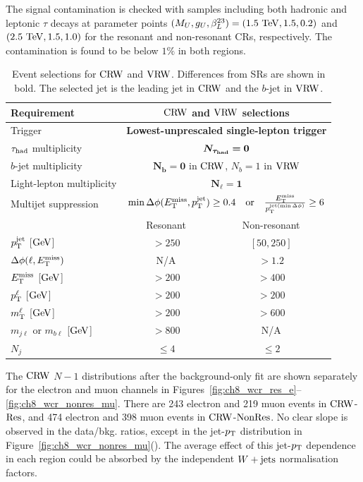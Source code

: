 The signal contamination is checked with samples including both hadronic and leptonic $\tau$ decays at parameter points $(M_U,g_U,\beta_L^{23})=(1.5~\mathrm{TeV},1.5,0.2)$ and $(2.5~\mathrm{TeV},1.5,1.0)$ for the resonant and non-resonant CRs, respectively. The contamination is found to be below $1\%$ in both regions.

\begin{table}[htbp]
    \centering
    \small
    \caption[Event selections for $\CRW$ and $\VRW$]{Event selections for $\CRW$ and $\VRW$. Differences from SRs are shown in bold. The selected jet is the leading jet in $\CRW$ and the $b$-jet in $\VRW$.}
    \label{tab:ch8_wcr_vrw}
    \begin{tabular}{lcc}
        \toprule
        Requirement & \multicolumn{2}{c}{$\CRW$ and $\VRW$ selections} \\
        \midrule
        Trigger & \multicolumn{2}{c}{\textbf{Lowest-unprescaled single-lepton trigger}} \\
        $\tau_{\mathrm{had}}$ multiplicity & \multicolumn{2}{c}{$\bm{N_{\tau_{\mathrm{had}}}=0}$} \\
        $b$-jet multiplicity & \multicolumn{2}{c}{$\bm{N_b=0}$ in $\CRW$, $N_b=1$ in $\VRW$} \\
        Light-lepton multiplicity & \multicolumn{2}{c}{$\bm{N_\ell=1}$} \\
        Multijet suppression & \multicolumn{2}{c}{$\min\Delta\phi(E_{\mathrm{T}}^{\mathrm{miss}},p_{\mathrm{T}}^{\mathrm{jet}})\geq0.4\quad\text{or}\quad\frac{E_{\mathrm{T}}^{\mathrm{miss}}}{p_{\mathrm{T}}^{\mathrm{jet}(\min{\Delta\phi)}}}\geq6$} \\
        \midrule
         & Resonant & Non-resonant \\
        \midrule
        $p_{\mathrm{T}}^\mathrm{jet}$ [$\mathrm{GeV}$] & $>250$ & $[50, 250]$ \\
        $\Delta\phi(\ell, E_{\mathrm{T}}^{\mathrm{miss}})$ & N/A & $>1.2$ \\
        $E_{\mathrm{T}}^{\mathrm{miss}}$ [$\mathrm{GeV}$] & $>200$ & $>400$ \\
        $p_{\mathrm{T}}^\ell$ [$\mathrm{GeV}$] & $>200$ & $>200$ \\
        $m_{\mathrm{T}}^\ell$ [$\mathrm{GeV}$] & $>200$ & $>600$ \\
        $m_{j\ell}$ or $m_{b\ell}$ [$\mathrm{GeV}$] & $>800$ & N/A \\
        $N_j$ & $\leq4$ & $\leq2$ \\
        \bottomrule
    \end{tabular}
\end{table}

The $\CRW$ $N-1$ distributions after the background-only fit are shown separately for the electron and muon channels in Figures~\ref{fig:ch8_wcr_res_e}--\ref{fig:ch8_wcr_nonres_mu}.
There are 243 electron and 219 muon events in $\CRW$-$\mathrm{Res}$, and 474 electron and 398 muon events in $\CRW$-$\mathrm{NonRes}$.
No clear slope is observed in the data/bkg. ratios, except in the jet-$p_{\mathrm{T}}$ distribution in Figure~\ref{fig:ch8_wcr_nonres_mu}().
The average effect of this jet-$p_{\mathrm{T}}$ dependence in each region could be absorbed by the independent $W+\mathrm{jets}$ normalisation factors.

